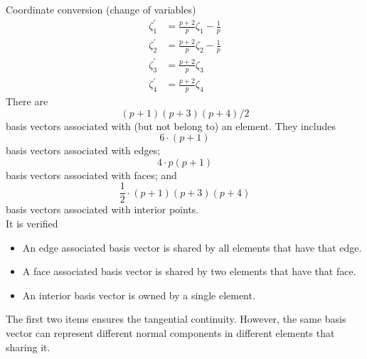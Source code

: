\documentclass[a4paper,onecolumn]{article}
\begin{document}
Coordinate conversion (change of variables)
\begin{equation*}\begin{split}
    \zeta_1^\prime &= \frac{p+2}{p}\zeta_1-\frac{1}{p}\\
    \zeta_2^\prime &= \frac{p+2}{p}\zeta_2-\frac{1}{p}\\
    \zeta_3^\prime &= \frac{p+2}{p}\zeta_3\\
    \zeta_4^\prime &= \frac{p+2}{p}\zeta_4
\end{split}\end{equation*}
There are
$$
    (p+1)(p+3)(p+4)/2 
$$
basis vectors associated with (but not belong to) an element.
They includes
$$
    6\cdot (p+1)
$$
basis vectors associated with edges;
$$
    4\cdot p(p+1)
$$
basis vectors associated with faces; and
$$
    \frac{1}{2}\cdot (p+1)(p+3)(p+4)
$$
basis vectors associated with interior points.\\
It is verified
\begin{itemize}
    \item An edge associated basis vector is shared by all elements that have that edge.
    \item A face associated basis vector is shared by two elements that have that face.
    \item An interior basis vector is owned by a single element.
\end{itemize}
The first two items ensures the tangential continuity. However, the same basis vector
can represent different normal components in different elements that sharing it.
\end{document}
